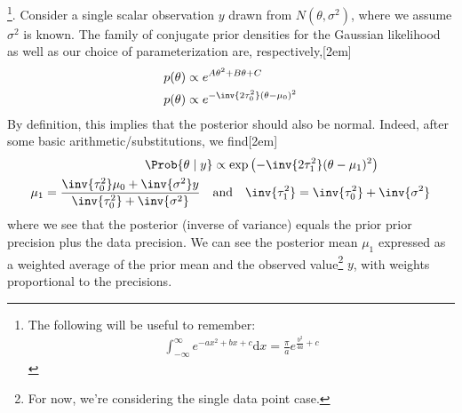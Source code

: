 \documentclass[11pt]{article}
\newcommand\myspace[1][]{\vspace{#1\bigskipamount}}
\newcommand\p{\Needspace{10\baselineskip} \noindent}
\begin{document}
\myspace
\p {}\footnote{The following will be useful to remember:
	\begin{align}
		\int_{-\infty}^{\infty} e^{-a x^2 + b x + c} \mathrm{d} x = \frac{\pi}{a} e^{\frac{b^2}{4a} + c}
	\end{align}
}. Consider a single scalar observation $y$ drawn from $N(\theta, \sigma^2)$, where we assume $\sigma^2$ is known. The family of conjugate prior densities for the Gaussian likelihood as well as our choice of parameterization are, respectively,[2em]
\begin{align}
	p(\theta) &\propto e^{A\theta^2 + B\theta + C} \\
	p(\theta) &\propto e^{-\inv{2\tau_0^2}(\theta - \mu_0)^2  }
\end{align}
By definition, this implies that the posterior should also be normal. Indeed, after some basic arithmetic/substitutions, we find[2em]
\begin{align}
	\Prob{\theta \mid y} &\propto \exp\left(
		- \inv{2 \tau_1^2} (\theta - \mu_1)^2
	\right) \\
	\mu_1 = \frac{ \inv{\tau_0^2}\mu_0 + \inv{\sigma^2} y }{ \inv{\tau_0^2} + \inv{\sigma^2}    } 
	\quad &\text{and} \quad
	\inv{\tau_1^2} = \inv{\tau_0^2} + \inv{\sigma^2} 
\end{align}
where we see that the posterior  (inverse of variance) equals the prior prior precision plus the data precision. We can see the posterior mean $\mu_1$ expressed as a weighted average of the prior mean and the observed value\footnote{For now, we're considering the single data point case.} $y$, with weights proportional to the precisions.
\end{document}
